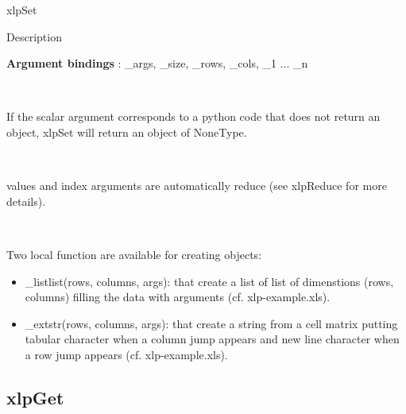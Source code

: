 \begin{xlpfunctitle}{xlpSet}
\begin{xlpfunc}{Description}
\

\textbf{Argument bindings} : \_args, \_size, \_rows, \_cols, \_1 ... \_n

\

If the scalar argument corresponds to a python code that does not return an object, xlpSet will return an object of NoneType. 

\

values and index arguments are automatically reduce (see xlpReduce for more details).

\

Two local function are available for creating objects:
\begin{itemize}
\item \_listlist(rows, columns, args): that create a list of list of dimenstions (rows, columns) filling the data with arguments (cf. xlp-example.xls).
\item \_extstr(rows, columns, args): that create a string from a cell matrix putting tabular character when a column jump appears and new line character when a row jump appears (cf. xlp-example.xls).
\end{itemize}

\end{xlpfunc}

\end{xlpfunctitle}

\subsection{xlpGet}

